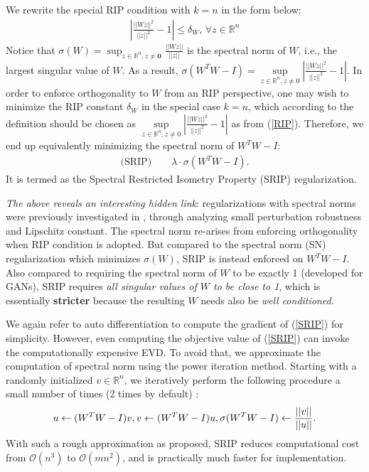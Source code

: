 \documentclass{article}
\newcommand{\R}{\mathbb{R}}
\begin{document}
We rewrite the special RIP condition with $k = n$ in the form below:
\begin{equation}
\begin{aligned}
\left|\frac{||Wz||^2}{||z||^2} - 1\right| \le \delta_W, \, \forall z \in \R^n
\end{aligned}
\label{RIP}
\end{equation}
Notice that $\sigma (W) = \sup_{z \in \R^n, z \neq \boldsymbol{0}} \frac{||Wz||}{||z||}$ is the spectral norm of $W$, i.e., the largest singular value of $W$. As a result, $\sigma (W^TW - I) = \underset{{z \in \R^n, z}\neq 0} {\sup}|\frac{||Wz||^2}{||z||^2} - 1|$. In order to enforce orthogonality to $W$ from an RIP perspective, one may wish to minimize the RIP constant $\delta_W$ in the special case $k = n$, which according to the definition should be chosen as $\underset{{z \in \R^n, z}\neq 0} {\sup}|\frac{||Wz||^2}{||z||^2} - 1|$ as from (\ref{RIP}). Therefore, we end up equivalently minimizing the spectral norm of $W^TW - I$:
\begin{equation}
\begin{aligned}
\text{(SRIP)} \qquad \lambda\cdot \sigma (W^TW - I).
\end{aligned}
\label{SRIP}
\end{equation}
It is termed as the Spectral Restricted Isometry Property (SRIP) regularization.

\textit{The above reveals an interesting hidden link}: regularizations with spectral norms were previously investigated in \cite{yoshida2017spectral,miyato2018spectral}, through analyzing small perturbation robustness and Lipschitz constant. The spectral norm re-arises from enforcing orthogonality when RIP condition is adopted. But compared to the  spectral norm (SN) regularization \cite{yoshida2017spectral} which minimizes $\sigma (W)$, SRIP is instead enforced on $W^TW - I$. Also compared to \cite{miyato2018spectral} requiring the spectral norm of $W$ to be exactly 1 (developed for GANs), SRIP requires \textit{all singular values of $W$ to be close to 1}, which is essentially \textbf{stricter} because the resulting $W$ needs also be \textit{well conditioned}.

We again refer to auto differentiation to compute the gradient of (\ref{SRIP}) for simplicity. However, even computing the objective value of (\ref{SRIP}) can invoke the computationally expensive EVD. To avoid that, we approximate the computation of spectral norm using the power iteration method. Starting with a randomly initialized $v \in \R^n$, we iteratively perform the following procedure a small number of times (2 times by default) :
\vspace{-0.5em}
\begin{equation}
\begin{aligned}
u \leftarrow (W^TW - I)v, v \leftarrow (W^TW - I)u, \sigma (W^TW - I) \leftarrow \frac{||v||}{||u||}.
\end{aligned}
\label{power}
\vspace{-0.5em}
\end{equation}
With such a rough approximation as proposed, SRIP reduces computational cost from $\mathcal{O}(n^3)$ to $\mathcal{O}(mn^2)$, and is practically much faster for implementation.
\end{document}
